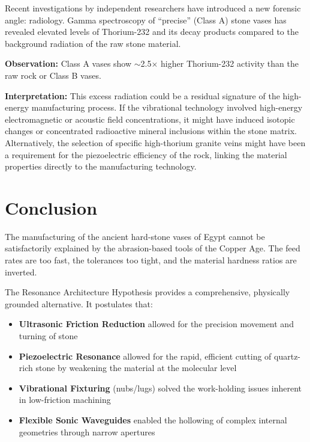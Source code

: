 \documentclass[11pt]{article}
\begin{document}
Recent investigations by independent researchers have introduced a new forensic angle: radiology. Gamma spectroscopy of ``precise'' (Class A) stone vases has revealed elevated levels of Thorium-232 and its decay products compared to the background radiation of the raw stone material.

\textbf{Observation:} Class A vases show $\sim$2.5$\times$ higher Thorium-232 activity than the raw rock or Class B vases.

\textbf{Interpretation:} This excess radiation could be a residual signature of the high-energy manufacturing process. If the vibrational technology involved high-energy electromagnetic or acoustic field concentrations, it might have induced isotopic changes or concentrated radioactive mineral inclusions within the stone matrix. Alternatively, the selection of specific high-thorium granite veins might have been a requirement for the piezoelectric efficiency of the rock, linking the material properties directly to the manufacturing technology.

\section{Conclusion}

The manufacturing of the ancient hard-stone vases of Egypt cannot be satisfactorily explained by the abrasion-based tools of the Copper Age. The feed rates are too fast, the tolerances too tight, and the material hardness ratios are inverted.

The Resonance Architecture Hypothesis provides a comprehensive, physically grounded alternative. It postulates that:

\begin{itemize}
    \item \textbf{Ultrasonic Friction Reduction} allowed for the precision movement and turning of stone
    \item \textbf{Piezoelectric Resonance} allowed for the rapid, efficient cutting of quartz-rich stone by weakening the material at the molecular level
    \item \textbf{Vibrational Fixturing} (nubs/lugs) solved the work-holding issues inherent in low-friction machining
    \item \textbf{Flexible Sonic Waveguides} enabled the hollowing of complex internal geometries through narrow apertures
\end{itemize}
\end{document}
